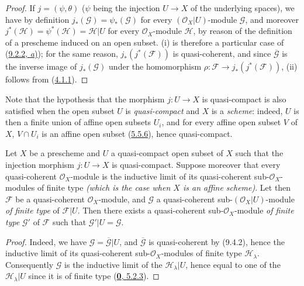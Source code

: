 \begin{proof}
If $j=(\psi,\theta)$ ($\psi$ being the injection $U\to X$ of the
underlying spaces), we have by definition $j_*(\mathscr{G})=\psi_*(\mathscr{G})$
for every $(\mathscr{O}_X|U)$-module $\mathscr{G}$, and moreover
$j^*(\mathscr{H})=\psi^*(\mathscr{H})=\mathscr{H}|U$ for every
$\mathscr{O}_X$-module $\mathscr{H}$, by reason of the definition of a
prescheme induced on an open subset. (i) is therefore a particular case of
(\hyperref[I.9.2.2]{9.2.2, \emph{a})}); for the same reason,
$j_*(j^*(\mathscr{F}))$ is quasi-coherent, and since
$\overline{\mathscr{G}}$ is the inverse image of $j_*(\mathscr{G})$ under
the homomorphism $\rho:\mathscr{F}\to j_*(j^*(\mathscr{F}))$, (ii) follows
from (\hyperref[I.4.1.1]{4.1.1}).
\end{proof}

Note that the hypothesis that the morphism $j:U\to X$ is quasi-compact is
also satisfied when the open subset $U$ is \emph{quasi-compact} and $X$ is a
\emph{scheme}: indeed, $U$ is then a finite union of affine open subsets
$U_i$, and for every affine open subset $V$ of $X$, $V\cap U_i$ is an affine
open subset (\hyperref[I.5.5.6]{5.5.6}), hence quasi-compact.

\begin{corollary}[9.4.3]
\label{I.9.4.3}
Let $X$ be a prescheme and $U$ a quasi-compact open subset of $X$ such that
the injection morphism $j:U\to X$ is quasi-compact. Suppose moreover that
every quasi-coherent $\mathscr{O}_X$-module is the inductive limit of its
quasi-coherent sub-$\mathscr{O}_X$-modules of finite type
\emph{(which is the case when $X$ is an \emph{affine scheme})}. Let then
$\mathscr{F}$ be a quasi-coherent $\mathscr{O}_X$-module, and $\mathscr{G}$
a quasi-coherent sub-$(\mathscr{O}_X|U)$-module \emph{of finite type} of
$\mathscr{F}|U$. Then there exists a quasi-coherent
sub-$\mathscr{O}_X$-module \emph{of finite type} $\mathscr{G}'$ of $\mathscr{F}$
such that $\mathscr{G}'|U=\mathscr{G}$.
\end{corollary}

\begin{proof}
Indeed, we have $\mathscr{G}=\overline{\mathscr{G}}|U$, and
$\overline{\mathscr{G}}$ is quasi-coherent by (9.4.2), hence the inductive
limit of its quasi-coherent sub-$\mathscr{O}_X$-modules of finite type
$\mathscr{H}_\lambda$. Consequently $\mathscr{G}$ is the inductive limit of
the $\mathscr{H}_\lambda|U$, hence equal to one of the
$\mathscr{H}_\lambda|U$ since it is of finite type
(\hyperref[0.5.2.3]{\textbf{0}, 5.2.3}).
\end{proof}

